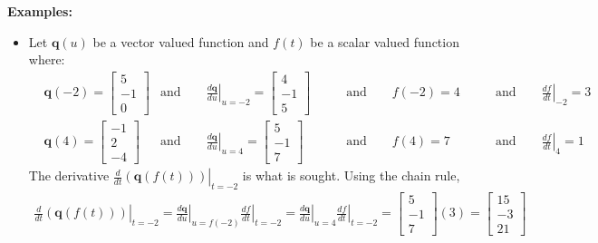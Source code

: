 \documentclass{article}
\begin{document}
\textbf{Examples:}
\begin{itemize} 
\item Let \(\mathbf{q}(u)\) be a vector valued function and \(f(t)\) be a scalar valued function where:
\begin{align*}
& \mathbf{q}(-2) = \begin{bmatrix} 5 \\ -1 \\ 0 \end{bmatrix} & \text{and}\quad\quad \left.\frac{d\mathbf{q}}{du}\right|_{u = -2} = \begin{bmatrix}  4 \\ -1 \\ 5 \end{bmatrix}\quad\quad & \text{and}\quad\quad f(-2) = 4\quad\quad & \text{and}\quad\quad \left.\frac{df}{dt}\right|_{-2} = 3 \\ 
& \mathbf{q}(4) = \begin{bmatrix} -1 \\ 2 \\ -4 \end{bmatrix} & \text{and}\quad\quad \left.\frac{d\mathbf{q}}{du}\right|_{u = 4} = \begin{bmatrix}  5 \\ -1 \\ 7 \end{bmatrix}\quad\quad & \text{and}\quad\quad f(4) = 7\quad\quad & \text{and}\quad\quad \left.\frac{df}{dt}\right|_{4} = 1
\end{align*}
The derivative \(\left.\frac{d}{dt}(\mathbf{q}(f(t)))\right|_{t = -2}\) is what is sought. Using the chain rule, 
\begin{align*}
\left.\frac{d}{dt}(\mathbf{q}(f(t)))\right|_{t = -2} = \left.\frac{d\mathbf{q}}{du}\right|_{u = f(-2)} \left.\frac{df}{dt}\right|_{t = -2} 
= \left.\frac{d\mathbf{q}}{du}\right|_{u = 4} \left.\frac{df}{dt}\right|_{t = -2} 
= \begin{bmatrix}  5 \\ -1 \\ 7 \end{bmatrix}(3) 
= \begin{bmatrix} 15 \\ -3 \\ 21 \end{bmatrix}
\end{align*}
\end{itemize}
\end{document}
